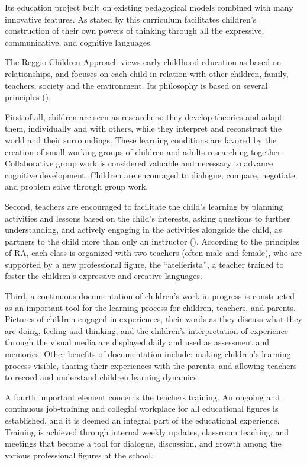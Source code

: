 \documentclass[12pt]{article}
\begin{document}
Its education project built on existing pedagogical models combined with many innovative features. As stated by \cite{Edwards1993} this curriculum facilitates children's construction of their own powers of thinking through all the expressive, communicative, and cognitive languages.

The Reggio Children Approach views early childhood education as based on relationships, and focuses on each child in relation with other children, family, teachers, society and the environment. Its philosophy is based on several principles (\cite{Rinaldi2005,Gandini1993}).

First of all, children are seen as researchers: they develop theories and adapt them, individually and with others, while they interpret and reconstruct the world and their surroundings. These learning conditions are favored by the creation of small working groups of children and adults researching together. Collaborative group work is considered valuable and necessary to advance cognitive development. Children are encouraged to dialogue, compare, negotiate, and problem solve through group work.

Second, teachers are encouraged to facilitate the child's learning by planning activities and lessons based on the child's interests, asking questions to further understanding, and actively engaging in the activities alongside the child, as partners to the child more than only an instructor (\cite{Hewett2001}). According to the principles of RA, each class is organized with two teachers (often male and female), who are supported by a new professional figure, the ``atelierista'', a teacher trained to foster the children's expressive and creative languages.

Third, a continuous documentation of children's work in progress is constructed as an important tool for the learning process for children, teachers, and parents. Pictures of children engaged in experiences, their words as they discuss what they are doing, feeling and thinking, and the children's interpretation of experience through the visual media are displayed daily and used as assessment and memories. Other benefits of documentation include: making children's learning process visible, sharing their experiences with the parents, and allowing teachers to record and understand children learning dynamics.

A fourth important element concerns the teachers training. An ongoing and continuous job-training and collegial workplace for all educational figures is established, and it is deemed an integral part of the educational experience. Training is achieved through internal weekly updates, classroom teaching, and meetings that become a tool for dialogue, discussion, and growth among the various professional figures at the school.
\end{document}
